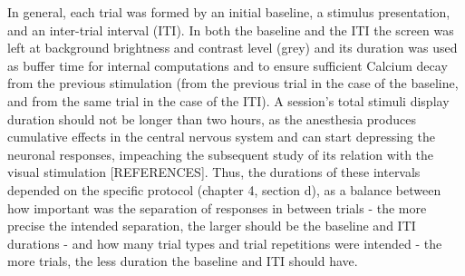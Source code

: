 In general, each trial was formed by an initial baseline, a stimulus presentation, and an inter-trial interval (ITI). In both the baseline and the ITI the screen was left at background brightness and contrast level (grey) and its duration was used as buffer time for internal computations and to ensure sufficient Calcium decay from the previous stimulation (from the previous trial in the case of the baseline, and from the same trial in the case of the ITI). A session's total stimuli display duration should not be longer than two hours, as the anesthesia produces cumulative effects in the central nervous system and can start depressing the neuronal responses, impeaching the subsequent study of its relation with the visual stimulation [REFERENCES]. Thus, the durations of these intervals depended on the specific protocol (chapter 4, section d), as a balance between how important was the separation of responses in between trials - the more precise the intended separation, the larger should be the baseline and ITI durations - and how many trial types and trial repetitions were intended - the more trials, the less duration the baseline and ITI should have.

 \begin{table}[H]
\begin{center}\par
{}
 \caption{Protocol configurations regarding session extension and trial durations.}
    \vspace{-5mm}
    \label{table:times}
\end{center}
\end{table}